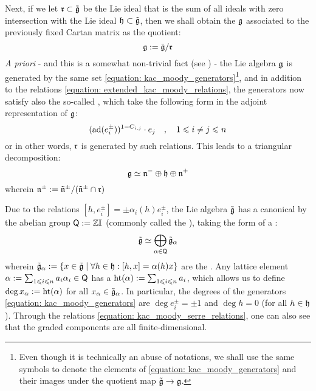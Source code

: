 Next, if we let $\mathfrak{r} \subset \tilde{\mathfrak{g}}$ be the Lie ideal that is the sum of all ideals with zero intersection with the Lie ideal $\mathfrak{h} \subset \tilde{\mathfrak{g}}$, then we shall obtain the  $\mathfrak{g}$ associated to the previously fixed Cartan matrix as the quotient:
    $$\mathfrak{g} := \tilde{\mathfrak{g}}/\mathfrak{r}$$
\textit{A priori} - and this is a somewhat non-trivial fact (see \cite[Theorem 9.11]{kac_infinite_dimensional_lie_algebras}) - the Lie algebra $\mathfrak{g}$ is generated by the same set \eqref{equation: kac_moody_generators}\footnote{Even though it is technically an abuse of notations, we shall use the same symbols to denote the elements of \eqref{equation: kac_moody_generators} and their images under the quotient map $\tilde{\mathfrak{g}} \to \mathfrak{g}$.}, and in addition to the relations \eqref{equation: extended_kac_moody_relations}, the generators now satisfy also the so-called , which take the following form in the adjoint representation of $\mathfrak{g}$:
    \begin{equation} \label{equation: kac_moody_serre_relations}
        ( \mathrm{ad}( e_i^{\pm} ) )^{1 - C_{i, j}} \cdot e_j \quad, \quad 1 \leqslant i \not = j \leqslant n
    \end{equation}
or in other words, $\mathfrak{r}$ is generated by such relations. This leads to a triangular decomposition:
    \begin{equation} \label{equation: kac_moody_triangular_decomposition}
        \mathfrak{g} \simeq \mathfrak{n}^- \oplus \mathfrak{h} \oplus \mathfrak{n}^+
    \end{equation}
wherein $\mathfrak{n}^{\pm} := \tilde{\mathfrak{n}}^{\pm}/( \tilde{\mathfrak{n}}^{\pm} \cap \mathfrak{r} )$

Due to the relations $[h, e_i^{\pm}] = \pm \alpha_i(h) e_i^{\pm}$, the Lie algebra $\tilde{\mathfrak{g}}$ has a canonical  by the abelian group $\mathsf{Q} := \mathbb{Z} \mathbb{I}$ (commonly called the ), taking the form of a :
    $$\tilde{\mathfrak{g}} \simeq \bigoplus_{\alpha \in \mathsf{Q}} \tilde{\mathfrak{g}}_{\alpha}$$
wherein $\tilde{\mathfrak{g}}_{\alpha} := \{ x \in \tilde{\mathfrak{g}} \mid \forall h \in \mathfrak{h}: [h, x] = \alpha(h) x \}$ are the . Any lattice element $\alpha := \sum_{1 \leqslant i \leqslant n} a_i \alpha_i \in \mathsf{Q}$ has a  $\operatorname{ht}(\alpha) := \sum_{1 \leqslant i \leqslant n} a_i$, which allows us to define $\deg x_{\alpha} := \operatorname{ht}(\alpha)$ for all $x_{\alpha} \in \tilde{\mathfrak{g}}_{\alpha}$. In particular, the degrees of the generators \eqref{equation: kac_moody_generators} are $\deg e_i^{\pm} = \pm 1$ and $\deg h = 0$ (for all $h \in \mathfrak{h}$). Through the relations \eqref{equation: kac_moody_serre_relations}, one can also see that the graded components are all finite-dimensional.

